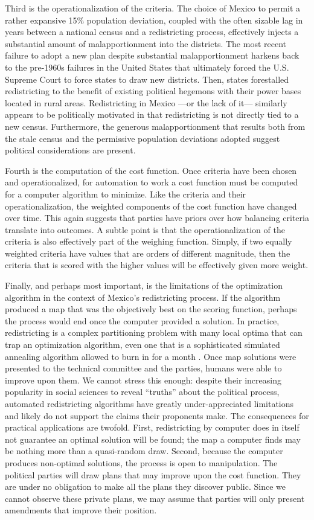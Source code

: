\documentclass[letter,12pt]{article}
\begin{document}
Third is the operationalization of the criteria. The choice of Mexico to permit a rather expansive 15\% population deviation, coupled with the often sizable lag in years between a national census and a redistricting process, effectively injects a substantial amount of malapportionment into the districts. The most recent failure to adopt a new plan despite substantial malapportionment harkens back to the pre-1960s failures in the United States that ultimately forced the U.S. Supreme Court to force states to draw new districts. Then, states forestalled redistricting to the benefit of existing political hegemons with their power bases located in rural areas. Redistricting in Mexico ---or the lack of it--- similarly appears to be politically motivated in that redistricting is not directly tied to a new census. Furthermore, the generous malapportionment that results both from the stale census and the permissive population deviations adopted suggest political considerations are present.

Fourth is the computation of the cost function. Once criteria have been chosen and operationalized, for automation to work a cost function must be computed for a computer algorithm to minimize. Like the criteria and their operationalization, the weighted components of the cost function have changed over time. This again suggests  that parties have priors over how balancing criteria translate into outcomes. A subtle point is that the operationalization of the criteria is also effectively part of the weighing function. Simply, if two equally weighted criteria have values that are orders of different magnitude, then the criteria that is scored with the higher values will be effectively given more weight.

Finally, and perhaps most important, is the limitations of the optimization algorithm in the context of Mexico's redistricting process. If the algorithm produced a map that was the objectively best on the scoring function, perhaps the process would end once the computer provided a solution. In practice, redistricting is a complex partitioning problem with many local optima that can trap an optimization algorithm, even one that is a sophisticated simulated annealing algorithm allowed to burn in for a month \citep{altman.mcdonald2011bard}. Once map solutions were presented to the technical committee and the parties, humans were able to improve upon them. We cannot stress this enough: despite their increasing popularity in social sciences to reveal ``truths'' about the political process, automated redistricting algorithms have greatly under-appreciated limitations and likely do not support the claims their proponents make. The consequences for practical applications are twofold. First, redistricting by computer does in itself not guarantee an optimal solution will be found; the map a computer finds may be nothing more than a quasi-random draw. Second, because the computer produces non-optimal solutions, the process is open to manipulation. The political parties will draw plans that may improve upon the cost function. They are under no obligation to make all the plans they discover public. Since we cannot observe these private plans, we may assume that parties will only present amendments that improve their position.
\end{document}
